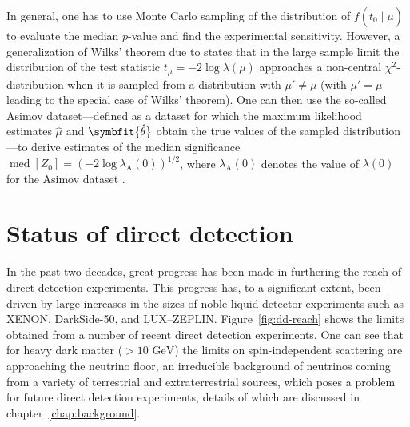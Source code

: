 \documentclass[b5paper, 10pt, twoside]{book}
\newcommand{\unitv}[1]{\symbfit{\hat{#1}}}
\DeclareMathOperator{\med}{med}
\begin{document}
In general, one has to use Monte Carlo sampling of the distribution of $f(\tilde{t}_0\mid\mu)$ to evaluate the median $p$-value and find the experimental sensitivity. However, a generalization of Wilks' theorem due to \textcite{Wald1943} states that in the large sample limit the distribution of the test statistic $t_\mu=-2\log\lambda(\mu)$ approaches a non-central $\chi^2$-distribution when it is sampled from a distribution with $\mu'\neq\mu$ (with $\mu'=\mu$ leading to the special case of Wilks' theorem). One can then use the so-called Asimov dataset---defined as a dataset for which the maximum likelihood estimates $\hat{\mu}$ and $\unitv{\theta}$ obtain the true values of the sampled distribution---to derive estimates of the median significance $\med[Z_0]=(-2\log\lambda_\text{A}(0))^{1/2}$, where $\lambda_\text{A}(0)$ denotes the value of $\lambda(0)$ for the Asimov dataset \parencite{CowanEtAl2011}.

\section{Status of direct detection}

In the past two decades, great progress has been made in furthering the reach of direct detection experiments. This progress has, to a significant extent, been driven by large increases in the sizes of noble liquid detector experiments such as XENON, DarkSide-50, and LUX--ZEPLIN. Figure~\ref{fig:dd-reach} shows the limits obtained from a number of recent direct detection experiments. One can see that for heavy dark matter ($> 10\text{ GeV}$) the limits on spin-independent scattering are approaching the neutrino floor, an irreducible background of neutrinos coming from a variety of terrestrial and extraterrestrial sources, which poses a problem for future direct detection experiments, details of which are discussed in chapter~\ref{chap:background}.
\end{document}

